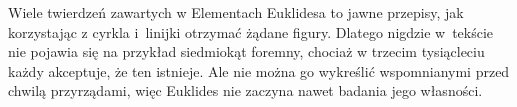 Wiele twierdzeń zawartych w Elementach Euklidesa to jawne przepisy, jak korzystając z cyrkla i~linijki otrzymać żądane figury.
Dlatego nigdzie w~tekście nie pojawia się na przykład siedmiokąt foremny, chociaż w trzecim tysiącleciu każdy akceptuje, że ten istnieje.
Ale nie można go wykreślić wspomnianymi przed chwilą przyrządami, więc Euklides nie zaczyna nawet badania jego własności.








%
